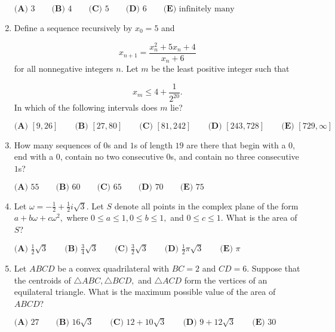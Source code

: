 \documentclass{article}
\begin{document}
\begin{enumerate}[label=\arabic*., itemsep=0.5em]
$\textbf{(A) } 3 \qquad\textbf{(B) } 4 \qquad\textbf{(C) } 5 \qquad\textbf{(D) } 6 \qquad\textbf{(E) } \text{infinitely many}$\par \vspace{0.5em}\item Define a sequence recursively by $x_0=5$ and

\begin{equation*}
x_{n+1}=\frac{x_n^2+5x_n+4}{x_n+6}
\end{equation*}
for all nonnegative integers $n.$ Let $m$ be the least positive integer such that

\begin{equation*}
x_m\leq 4+\frac{1}{2^{20}}.
\end{equation*}
In which of the following intervals does $m$ lie?

$\textbf{(A) } [9,26] \qquad\textbf{(B) } [27,80] \qquad\textbf{(C) } [81,242]\qquad\textbf{(D) } [243,728] \qquad\textbf{(E) } [729,\infty]$\par \vspace{0.5em}\item How many sequences of $0$s and $1$s of length $19$ are there that begin with a $0$, end with a $0$, contain no two consecutive $0$s, and contain no three consecutive $1$s?

$\textbf{(A) }55\qquad\textbf{(B) }60\qquad\textbf{(C) }65\qquad\textbf{(D) }70\qquad\textbf{(E) }75$\par \vspace{0.5em}\item Let $\omega=-\tfrac{1}{2}+\tfrac{1}{2}i\sqrt3.$ Let $S$ denote all points in the complex plane of the form $a+b\omega+c\omega^2,$ where $0\leq a \leq 1,0\leq b\leq 1,$ and $0\leq c\leq 1.$ What is the area of $S$?

$\textbf{(A) } \frac{1}{2}\sqrt3 \qquad\textbf{(B) } \frac{3}{4}\sqrt3 \qquad\textbf{(C) } \frac{3}{2}\sqrt3\qquad\textbf{(D) } \frac{1}{2}\pi\sqrt3 \qquad\textbf{(E) } \pi$\par \vspace{0.5em}\item Let $ABCD$ be a convex quadrilateral with $BC=2$ and $CD=6.$ Suppose that the centroids of $\triangle ABC,\triangle BCD,$ and $\triangle ACD$ form the vertices of an equilateral triangle. What is the maximum possible value of the area of $ABCD$?

$\textbf{(A) } 27 \qquad\textbf{(B) } 16\sqrt3 \qquad\textbf{(C) } 12+10\sqrt3 \qquad\textbf{(D) } 9+12\sqrt3 \qquad\textbf{(E) } 30$\par \vspace{0.5em}\end{enumerate}
\end{document}
